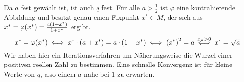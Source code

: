 \documentclass{scrreprt}
\begin{document}
Da $a$ fest gewählt ist, ist auch $q$ fest.
Für alle $a > \frac{1}{2}$ ist $\varphi$ eine kontrahierende Abbildung und
besitzt genau einen Fixpunkt $x^* \in M$, der sich aus
$x^* = \varphi\qty(x^*) = \frac{a\qty(1 + x^*)}{1 + x^*}$ ergibt.
\[
  x^* = \varphi\qty(x^*)
  \iff x^* \cdot (a + x^*) = a \cdot (1 + x^*)
  \iff \qty(x^*)^2 = a
  \overset{x_n > 0}\iff x^* = \sqrt{a}
\]
Wir haben hier ein Iterationsverfahren um Näherungsweise die Wurzel einer
positiven reellen Zahl zu bestimmen.
Eine schnelle Konvergenz ist für kleine Werte von $q$, also einem $a$ nahe bei
$1$ zu erwarten.
\end{document}
